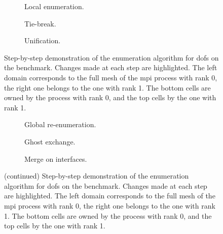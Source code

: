 {%
\let\oldthesubfigure\thesubfigure
\renewcommand{\thesubfigure}{Phase \arabic{subfigure}}

\def\Length{1}
\def\Radius{0.03}

\begin{figure}
\centering
\begin{subfigure}{\textwidth}
  \resizebox{\textwidth}{!}{
    
    \hfill{}
    
  }
  \caption{Local enumeration.}
\end{subfigure}
\begin{subfigure}{\textwidth}
  \resizebox{\textwidth}{!}{
    
    \hfill{}
    
  }
  \caption{Tie-break.}
\end{subfigure}
\begin{subfigure}{\textwidth}
  \resizebox{\textwidth}{!}{
    
    \hfill{}
    
  }
  \caption{Unification.}
\end{subfigure}
\caption[Step-by-step demonstration of the enumeration algorithm for  on the benchmark.]{Step-by-step demonstration of the enumeration algorithm for \glspl{dof} on the benchmark. Changes made at each step are highlighted. The left domain corresponds to the full mesh of the \gls{mpi} process with rank 0, the right one belongs to the one with rank 1. The bottom cells are owned by the process with rank 0, and the top cells by the one with rank 1.}
\label{fig:enumdemosteps}
\end{figure}

\begin{figure}
\ContinuedFloat
\begin{subfigure}{\textwidth}
  \resizebox{\textwidth}{!}{
    
    \hfill{}
    
  }
  \caption{Global re-enumeration.}
\end{subfigure}
\begin{subfigure}{\textwidth}
  \resizebox{\textwidth}{!}{
    
    \hfill{}
    
  }
  \caption{Ghost exchange.}
\end{subfigure}
\begin{subfigure}{\textwidth}
  \resizebox{\textwidth}{!}{
    
    \hfill{}
    
  }
  \caption{Merge on interfaces.}
\end{subfigure}
\caption[]{\textup{(continued)} Step-by-step demonstration of the enumeration algorithm for \glspl{dof} on the benchmark. Changes made at each step are highlighted. The left domain corresponds to the full mesh of the \gls{mpi} process with rank 0, the right one belongs to the one with rank 1. The bottom cells are owned by the process with rank 0, and the top cells by the one with rank 1.}
\end{figure}

\renewcommand{\thesubfigure}{\oldthesubfigure}
}
